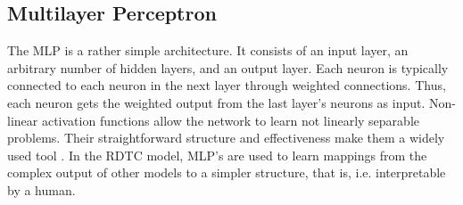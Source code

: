 \documentclass[a4paper,cleardoubleempty,BCOR1cm, 11pt]{report}
\begin{document}
\subsection{Multilayer Perceptron}\label{sec:MLP}
The MLP is a rather simple architecture. It consists of an input layer, an arbitrary number of hidden layers, and an output layer. Each neuron is typically connected to each neuron in the next layer through weighted connections. Thus, each neuron gets the weighted output from the last layer's neurons as input. Non-linear activation functions allow the network to learn not linearly separable problems. Their straightforward structure and effectiveness make them a widely used tool \cite{beale1990neural}. In the RDTC model, MLP's are used to learn mappings from the complex output of other models to a simpler structure, that is, i.e. interpretable by a human.
\end{document}
